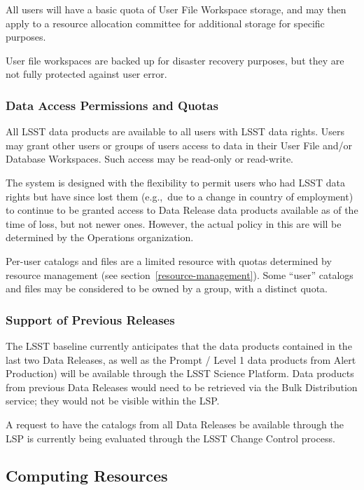 All users will have a basic quota of User File Workspace storage, and may then
apply to a resource allocation committee for additional storage for specific
purposes.

User file workspaces are backed up for disaster recovery purposes, but they are
not fully protected against user error.

\subsubsection{Data Access Permissions and Quotas}\label{data-access-permissions-and-quotas}

All LSST data products are available to all users with LSST data rights.
Users may grant other users or groups of users access to data in their User
File and/or Database Workspaces.
Such access may be read-only or read-write.

The system is designed with the flexibility to permit users who had LSST data
rights but have since lost them (e.g.,\ due to a change in country of
employment) to continue to be granted access to Data Release data products
available as of the time of loss, but not newer ones.
However, the actual policy in this are will be determined by the Operations
organization.

Per-user catalogs and files are a limited resource with quotas determined by
resource management (see section~\ref{resource-management}).
Some ``user'' catalogs and files may be considered to be owned by a group,
with a distinct quota.

\subsubsection{Support of Previous Releases}\label{support-of-previous-releases}

The LSST baseline currently anticipates that the data products contained in the
last two Data Releases, as well as the Prompt / Level 1 data products from
Alert Production) will be available through the LSST Science Platform.
Data products from previous Data Releases would need to be retrieved via the
Bulk Distribution service; they would not be visible within the LSP.

A request to have the catalogs from all Data Releases be available through
the LSP is currently being evaluated through the LSST Change Control process.

\subsection{Computing Resources}\label{computing-resources}

